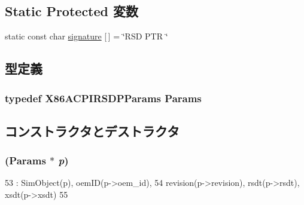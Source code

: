 \subsection*{Static Protected 変数}
\begin{DoxyCompactItemize}
\item 
static const char \hyperlink{classX86ISA_1_1ACPI_1_1RSDP_a0a2d9cdd770f9baaf77aee1519540efa}{signature} \mbox{[}$\,$\mbox{]} = \char`\"{}RSD PTR \char`\"{}
\end{DoxyCompactItemize}


\subsection{型定義}
\hypertarget{classX86ISA_1_1ACPI_1_1RSDP_a031f22f0e242bdc57633b2ac2c5559f3}{
\subsubsection[{Params}]{\setlength{\rightskip}{0pt plus 5cm}typedef X86ACPIRSDPParams {\bf Params}}}
\label{classX86ISA_1_1ACPI_1_1RSDP_a031f22f0e242bdc57633b2ac2c5559f3}


\subsection{コンストラクタとデストラクタ}
\hypertarget{classX86ISA_1_1ACPI_1_1RSDP_a7e949d21cd51426624a6408dc06f393c}{
\subsubsection[{RSDP}]{ ({\bf Params} $\ast$ {\em p})}}
\label{classX86ISA_1_1ACPI_1_1RSDP_a7e949d21cd51426624a6408dc06f393c}



\begin{DoxyCode}
53                               : SimObject(p), oemID(p->oem_id),
54     revision(p->revision), rsdt(p->rsdt), xsdt(p->xsdt)
55 {}
\end{DoxyCode}


